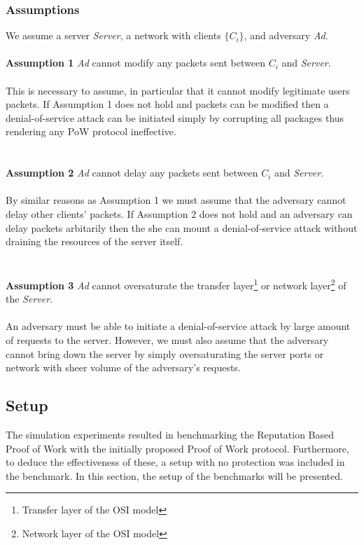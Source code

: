 \subsubsection{Assumptions}
We assume a server \emph{Server}, a network with clients \emph{$\{C_i\}$}, and adversary \emph{Ad}.
\\
\\
\noindent \textbf{Assumption 1} \indent \emph{Ad} cannot modify any packets sent between \emph{$C_i$} and \emph{Server}.
\\
\\
This is necessary to assume, in particular that it cannot modify legitimate users packets. If Assumption 1 does not hold and packets can be modified then a denial-of-service attack can be initiated simply by corrupting all packages thus rendering any PoW protocol ineffective.
\\
\\
\\
\noindent \textbf{Assumption 2} \indent \emph{Ad} cannot delay any packets sent between \emph{$C_i$} and \emph{Server}.
\\
\\
By similar reasons as Assumption 1 we must assume that the adversary cannot delay other clients' packets. If Assumption 2 does not hold and an adversary can delay packets arbitarily then the she can mount a denial-of-service attack without draining the resources of the server itself.
\\
\\
\\
\noindent \textbf{Assumption 3} \indent \emph{Ad} cannot oversaturate the transfer layer\footnote{Transfer layer of the OSI model} or network layer\footnote{Network layer of the OSI model} of the \emph{Server}.
\\
\\
An adversary must be able to initiate a denial-of-service attack by large amount of requests to the server. However, we must also assume that the adversary cannot bring down the server by simply oversaturating the server ports or network with sheer volume of the adversary's requests.

\subsection{Setup}
The simulation experiments resulted in benchmarking the Reputation Based Proof of Work with the initially proposed Proof of Work protocol. Furthermore, to deduce the effectiveness of these, a setup with no protection was included in the benchmark. In this section, the setup of the benchmarks will be presented.

